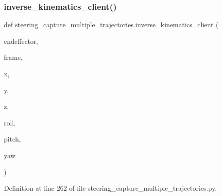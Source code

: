 \mbox{\label{namespacesteering__capture__multiple__trajectories_ad8355642b878dbeb866d47d4a9f453f2}} 
\subsubsection{\texorpdfstring{inverse\_kinematics\_client()}{inverse\_kinematics\_client()}}
{\footnotesize\ttfamily def steering\+\_\+capture\+\_\+multiple\+\_\+trajectories.\+inverse\+\_\+kinematics\+\_\+client (\begin{DoxyParamCaption}\item[{}]{endeffector,  }\item[{}]{frame,  }\item[{}]{x,  }\item[{}]{y,  }\item[{}]{z,  }\item[{}]{roll,  }\item[{}]{pitch,  }\item[{}]{yaw }\end{DoxyParamCaption})}



Definition at line 262 of file steering\+\_\+capture\+\_\+multiple\+\_\+trajectories.\+py.


